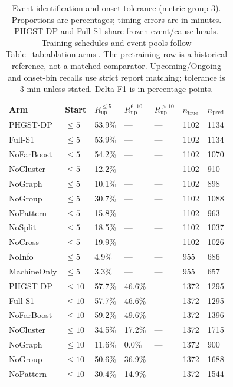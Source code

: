 \begin{table}[p]
\centering
\scriptsize
\setlength{\tabcolsep}{3pt}
\renewcommand{\arraystretch}{1.12}
\caption{Event identification and onset tolerance (metric group 3). Proportions are percentages; timing errors are in minutes. PHGST-DP and Full-S1 share frozen event/cause heads. Training schedules and event pools follow Table~\ref{tab:ablation-arms}. The pretraining row is a historical reference, not a matched comparator. Upcoming/Ongoing and onset-bin recalls use strict report matching; tolerance is 3 min unless stated. Delta F1 is in percentage points.}
\label{tab:complete-1-3}
\begin{tabularx}{\textwidth}{@{}lXXXXXX@{}}
\toprule
Arm & Start & $R_{\mathrm{up}}^{\le5}$ & $R_{\mathrm{up}}^{6\text{--}10}$ & $R_{\mathrm{up}}^{>10}$ & $n_{\mathrm{true}}$ & $n_{\mathrm{pred}}$ \\
\midrule
PHGST-DP & $\le 5$ & 53.9\% & --- & --- & 1102 & 1134 \\
Full-S1 & $\le 5$ & 53.9\% & --- & --- & 1102 & 1134 \\
NoFarBoost & $\le 5$ & 54.2\% & --- & --- & 1102 & 1070 \\
NoCluster & $\le 5$ & 12.2\% & --- & --- & 1102 & 910 \\
NoGraph & $\le 5$ & 10.1\% & --- & --- & 1102 & 898 \\
NoGroup & $\le 5$ & 30.7\% & --- & --- & 1102 & 1088 \\
NoPattern & $\le 5$ & 15.8\% & --- & --- & 1102 & 963 \\
NoSplit & $\le 5$ & 18.5\% & --- & --- & 1102 & 1037 \\
NoCross & $\le 5$ & 19.9\% & --- & --- & 1102 & 1026 \\
NoInfo & $\le 5$ & 4.9\% & --- & --- & 955 & 686 \\
MachineOnly & $\le 5$ & 3.3\% & --- & --- & 955 & 657 \\
\midrule
PHGST-DP & $\le 10$ & 57.7\% & 46.6\% & --- & 1372 & 1295 \\
Full-S1 & $\le 10$ & 57.7\% & 46.6\% & --- & 1372 & 1295 \\
NoFarBoost & $\le 10$ & 59.2\% & 49.6\% & --- & 1372 & 1396 \\
NoCluster & $\le 10$ & 34.5\% & 17.2\% & --- & 1372 & 1715 \\
NoGraph & $\le 10$ & 11.6\% & 0.0\% & --- & 1372 & 900 \\
NoGroup & $\le 10$ & 50.6\% & 36.9\% & --- & 1372 & 1688 \\
NoPattern & $\le 10$ & 30.4\% & 14.9\% & --- & 1372 & 1544 \\

\end{tabularx}
\end{table}
